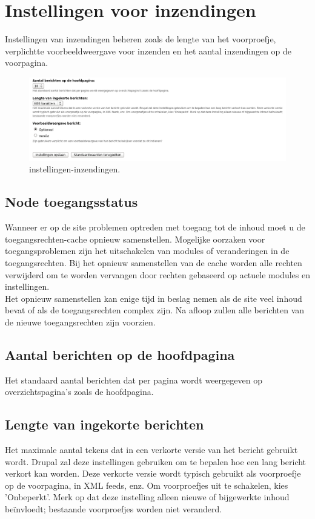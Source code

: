 \section{Instellingen voor inzendingen} 
Instellingen van inzendingen beheren zoals de lengte van het voorproefje,
verplichtte voorbeeldweergave  voor inzenden en het
aantal inzendingen op de voorpagina. \begin{figure}[!h]
    \centering
   \includegraphics[scale=0.3,angle=0]{instellingen-inzendingen}
   \caption{instellingen-inzendingen.\label{white}}
 \end{figure}
\subsection{Node toegangsstatus} 
Wanneer er op de site problemen optreden met toegang tot de inhoud moet u de toegangsrechten-cache
opnieuw samenstellen. Mogelijke oorzaken voor toegangsproblemen zijn het uitschakelen van modules of
veranderingen in de toegangsrechten. Bij het opnieuw samenstellen van de cache worden alle rechten
verwijderd om te worden vervangen door rechten gebaseerd op actuele modules en instellingen.
\\
Het opnieuw samenstellen kan enige tijd in beslag nemen als de site veel inhoud bevat of als de
toegangsrechten complex zijn. Na afloop zullen alle berichten van de nieuwe toegangsrechten zijn voorzien.
\subsection{Aantal berichten op de hoofdpagina}
Het standaard aantal berichten dat per pagina wordt weergegeven op
overzichtspagina's zoals de hoofdpagina.
\subsection{Lengte van ingekorte berichten}
Het maximale aantal tekens dat in een verkorte versie van het bericht gebruikt
wordt. Drupal zal deze instellingen gebruiken om te bepalen hoe een lang bericht
verkort kan worden. Deze verkorte versie wordt typisch gebruikt als voorproefje op
de voorpagina, in XML feeds, enz. Om voorproefjes uit te schakelen, kies 'Onbeperkt'.
Merk op dat deze instelling alleen nieuwe of bijgewerkte inhoud be\"invloedt;
bestaande voorproefjes worden niet veranderd.

